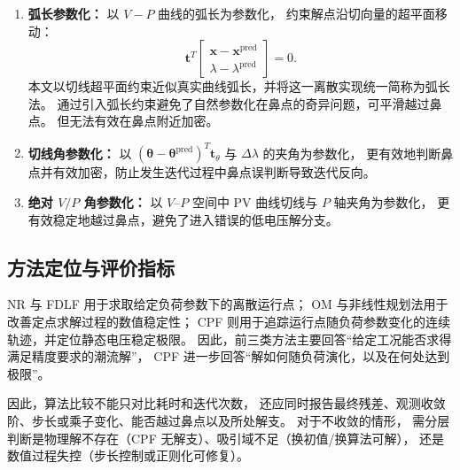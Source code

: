 \begin{enumerate}
\begin{equation}
\begin{bmatrix}
      F(\bm{x},\lambda) \\ V_k-V_k^{\mathrm{pred}}
    \end{bmatrix}.
  \end{equation}
  由于 $\lambda$ 可在校正中自由变化，该方法能够在鼻点处随解支转向，并继续追踪
  低电压分支。程序允许直接指定节点 $k$；未指定时，在基准点自动选取
  \begin{equation}
    k=\arg\max_{i\in\mathcal{N}_{PQ}}
    \left|\frac{\mathrm{d}V_i}{\mathrm{d}\lambda}\right|,
  \end{equation}
  即电压对负荷增长最敏感的 PQ 节点。该方法结构简单且适合主要表现为局部电压下降的
  场景，但若选定节点不能持续表征解支转向，或在故障、非均匀负荷增长下灵敏节点发生
  改变，增广方程仍可能失去良好条件。

  \item \textbf{弧长参数化：}
  以 $V-P$ 曲线的弧长为参数化，
  约束解点沿切向量的超平面移动：
  \begin{equation}
    \bm{t}^T\begin{bmatrix}\bm{x}-\bm{x}^{\text{pred}}\\\lambda-\lambda^{\text{pred}}\end{bmatrix}=0.
  \end{equation}
  本文以切线超平面约束近似真实曲线弧长，并将这一离散实现统一简称为弧长法。
  通过引入弧长约束避免了自然参数化在鼻点的奇异问题，可平滑越过鼻点。
  但无法有效在鼻点附近加密。

  \item \textbf{切线角参数化：}
  以 $(\bm{\theta}-\bm{\theta}^{\text{pred}})^T\bm{t}_\theta$ 与 $\Delta\lambda$ 的夹角为参数化，
  更有效地判断鼻点并有效加密，防止发生迭代过程中鼻点误判断导致迭代反向。

  \item \textbf{绝对 $V/P$ 角参数化：}
  以 $V$--$P$ 空间中 PV 曲线切线与 $P$ 轴夹角为参数化，
  更有效稳定地越过鼻点，避免了进入错误的低电压解分支。

\end{enumerate}

\subsection{方法定位与评价指标}

NR 与 FDLF 用于求取给定负荷参数下的离散运行点；
OM 与非线性规划法用于改善定点求解过程的数值稳定性；
CPF 则用于追踪运行点随负荷参数变化的连续轨迹，并定位静态电压稳定极限。
因此，前三类方法主要回答“给定工况能否求得满足精度要求的潮流解”，
CPF 进一步回答“解如何随负荷演化，以及在何处达到极限”。

因此，算法比较不能只对比耗时和迭代次数，
还应同时报告最终残差、观测收敛阶、步长或乘子变化、能否越过鼻点以及所处解支。
对于不收敛的情形，
需分层判断是物理解不存在（CPF 无解支）、吸引域不足（换初值/换算法可解），
还是数值过程失控（步长控制或正则化可修复）。
